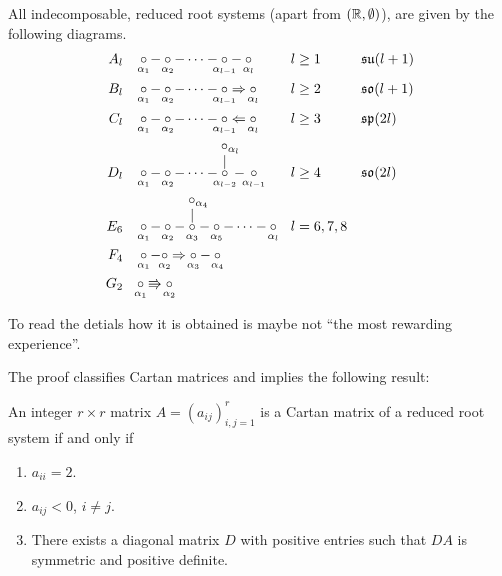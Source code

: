 \documentclass[11pt, english]{article}
\begin{document}
\begin{thm}
  All indecomposable, reduced root systems (apart from $(\mathbb{R}, \emptyset)$), are given by the following diagrams.
\begin{align*}
A_l &&& \underset{\mathclap{\alpha_1}}{\circ} - \underset{\mathclap{\alpha_2}}{\circ} - \dotsb - \underset{\mathclap{\alpha_{l-1}}}{\circ} - \underset{\mathclap{\alpha_l}}{\circ} &&  l \geq 1 && \mathfrak{su}(l+1) \\
%
B_l &&& \underset{\mathclap{\alpha_1}}{\circ} - \underset{\mathclap{\alpha_2}}{\circ} - \dotsb - \underset{\mathclap{\alpha_{l-1}}}{\circ} \Rightarrow \underset{\mathclap{\alpha_l}}{\circ} && l \geq 2 && \mathfrak{so}(l+1) \\
%
C_l &&& \underset{\mathclap{\alpha_1}}{\circ} - \underset{\mathclap{\alpha_2}}{\circ} - \dotsb - \underset{\mathclap{\alpha_{l-1}}}{\circ} \Leftarrow \underset{\mathclap{\alpha_l}}{\circ} && l \geq 3 && \mathfrak{sp}(2l) \\
%
D_l &&& \underset{\mathclap{\alpha_1}}{\circ} - \underset{\mathclap{\alpha_2}}{\circ} - \dotsb - \underset{\mathclap{\alpha_{l-2}}}{\overset{\overset{\textstyle\circ_{\mathrlap{\alpha_l}}}{\textstyle\vert}}{\circ}} \,-\, \underset{\mathclap{\alpha_{l-1}}}{\circ} && l \geq 4 && \mathfrak{so}(2l) \\
%
E_6 &&& \underset{\mathclap{\alpha_1}}{\circ} - \underset{\mathclap{\alpha_2}}{\circ} - \underset{\mathclap{\alpha_3}}{\overset{\overset{\textstyle\circ_{\mathrlap{\alpha_4}}}{\textstyle\vert}}{\circ}} - \underset{\mathclap{\alpha_5}}{\circ} -\dotsb  - \underset{\mathclap{\alpha_l}}{\circ} && l=6,7,8  \\
%
F_4 &&& \underset{\mathclap{\alpha_1}}{\circ} - \underset{\mathclap{\alpha_2}}{\circ} \Rightarrow \underset{\mathclap{\alpha_3}}{\circ} - \underset{\mathclap{\alpha_4}}{\circ} &&  \\
%
G_2 &&& \underset{\mathclap{\alpha_1}}{\circ} \Rrightarrow \underset{\mathclap{\alpha_2}}{\circ} && 
\end{align*}
\end{thm}

To read the detials how it is obtained is maybe not ``the most rewarding experience''.

The proof classifies Cartan matrices  and implies the following result:
\begin{prop}
  An integer $r \times r$ matrix $A=(a_{ij})_{i,j=1}^r$ is a Cartan matrix of a reduced root system if and only if
  \begin{enumerate}
  \item $a_{ii}=2$.
\item $a_{ij} < 0$, $i \neq j$.
\item There exists a diagonal matrix $D$ with positive entries such that $DA$ is symmetric and positive definite.
  \end{enumerate}
\end{prop}
\end{document}
